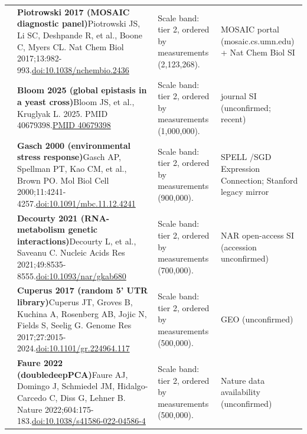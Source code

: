 \begin{landscape}
\begin{longtable}{@{}r@{\hspace{4pt}} L{86mm} L{92mm} L{62mm}@{}}
 & \textbf{Piotrowski 2017 (MOSAIC diagnostic panel)}\newline Piotrowski JS, Li SC, Deshpande R, et al., Boone C, Myers CL. Nat Chem Biol 2017;13:982-993.\newline \href{https://doi.org/10.1038/nchembio.2436}{doi:10.1038/\allowbreak nchembio.2436} & Scale band: tier 2, ordered by measurements (2,123,268). & MOSAIC portal (mosaic.cs.umn.edu) + Nat Chem Biol SI \\
 & \textbf{Bloom 2025 (global epistasis in a yeast cross)}\newline Bloom JS, et al., Kruglyak L. 2025. PMID 40679398.\newline \href{https://pubmed.ncbi.nlm.nih.gov/40679398/}{PMID 40679398} & Scale band: tier 2, ordered by measurements (1,000,000). & journal SI (unconfirmed; recent) \\
 & \textbf{Gasch 2000 (environmental stress response)}\newline Gasch AP, Spellman PT, Kao CM, et al., Brown PO. Mol Biol Cell 2000;11:4241-4257.\newline \href{https://doi.org/10.1091/mbc.11.12.4241}{doi:10.1091/\allowbreak mbc.11.12.4241} & Scale band: tier 2, ordered by measurements (900,000). & SPELL /\allowbreak  SGD Expression Connection; Stanford legacy mirror \\
 & \textbf{Decourty 2021 (RNA-metabolism genetic interactions)}\newline Decourty L, et al., Saveanu C. Nucleic Acids Res 2021;49:8535-8555.\newline \href{https://doi.org/10.1093/nar/gkab680}{doi:10.1093/\allowbreak nar/\allowbreak gkab680} & Scale band: tier 2, ordered by measurements (700,000). & NAR open-access SI (accession unconfirmed) \\
 & \textbf{Cuperus 2017 (random 5' UTR library)}\newline Cuperus JT, Groves B, Kuchina A, Rosenberg AB, Jojic N, Fields S, Seelig G. Genome Res 2017;27:2015-2024.\newline \href{https://doi.org/10.1101/gr.224964.117}{doi:10.1101/\allowbreak gr.224964.117} & Scale band: tier 2, ordered by measurements (500,000). & GEO (unconfirmed) \\
 & \textbf{Faure 2022 (doubledeepPCA)}\newline Faure AJ, Domingo J, Schmiedel JM, Hidalgo-Carcedo C, Diss G, Lehner B. Nature 2022;604:175-183.\newline \href{https://doi.org/10.1038/s41586-022-04586-4}{doi:10.1038/\allowbreak s41586-022-04586-4} & Scale band: tier 2, ordered by measurements (500,000). & Nature data availability (unconfirmed) \\

\end{longtable}
\end{landscape}
